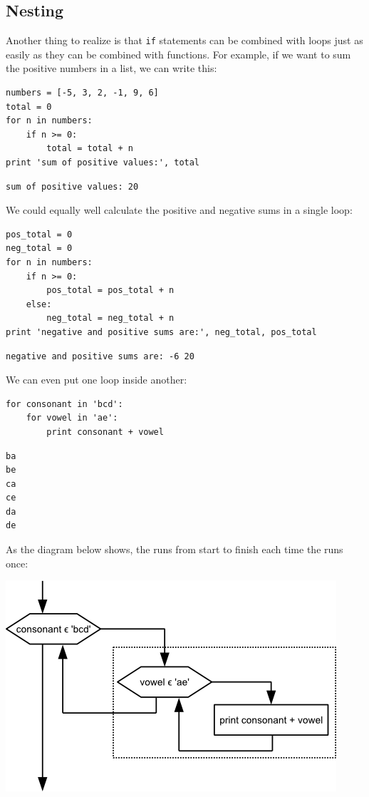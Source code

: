 \documentclass{book}
\begin{document}
\subsection{Nesting}

Another thing to realize is that \texttt{if} statements can be combined
with loops just as easily as they can be combined with functions. For
example, if we want to sum the positive numbers in a list, we can write
this:

\begin{verbatim}
numbers = [-5, 3, 2, -1, 9, 6]
total = 0
for n in numbers:
    if n >= 0:
        total = total + n
print 'sum of positive values:', total
\end{verbatim}

\begin{verbatim}
sum of positive values: 20
\end{verbatim}

We could equally well calculate the positive and negative sums in a
single loop:

\begin{verbatim}
pos_total = 0
neg_total = 0
for n in numbers:
    if n >= 0:
        pos_total = pos_total + n
    else:
        neg_total = neg_total + n
print 'negative and positive sums are:', neg_total, pos_total
\end{verbatim}

\begin{verbatim}
negative and positive sums are: -6 20
\end{verbatim}

We can even put one loop inside another:

\begin{verbatim}
for consonant in 'bcd':
    for vowel in 'ae':
        print consonant + vowel
\end{verbatim}

\begin{verbatim}
ba
be
ca
ce
da
de
\end{verbatim}

As the diagram below shows, the  runs
from start to finish each time the 
runs once:

\includegraphics{novice/python/img/python-flowchart-nested-loops.png}
\end{document}
